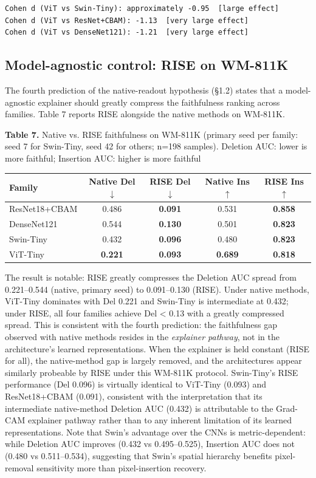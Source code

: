 \documentclass[11pt,a4paper]{article}
\begin{document}
\begin{Verbatim}
Cohen d (ViT vs Swin-Tiny): approximately -0.95  [large effect]
Cohen d (ViT vs ResNet+CBAM): -1.13  [very large effect]
Cohen d (ViT vs DenseNet121): -1.21  [very large effect]
\end{Verbatim}



\subsection{Model-agnostic control: RISE on WM-811K}

The fourth prediction of the native-readout hypothesis (\S{}1.2) states that a model-agnostic explainer should greatly compress the faithfulness ranking across families. Table 7 reports RISE alongside the native methods on WM-811K.

\begin{center}
\small \textbf{Table 7.} Native vs. RISE faithfulness on WM-811K (primary seed per family: seed 7 for Swin-Tiny, seed 42 for others; n=198 samples). Deletion AUC: lower is more faithful; Insertion AUC: higher is more faithful
\end{center}

\begin{tabular}{lcccc}
\toprule
Family & Native Del $\downarrow$ & RISE Del $\downarrow$ & Native Ins $\uparrow$ & RISE Ins $\uparrow$ \\
\midrule
ResNet18+CBAM & 0.486 & \textbf{0.091} & 0.531 & \textbf{0.858} \\
DenseNet121 & 0.544 & \textbf{0.130} & 0.501 & \textbf{0.823} \\
Swin-Tiny & 0.432 & \textbf{0.096} & 0.480 & \textbf{0.823} \\
ViT-Tiny & \textbf{0.221} & \textbf{0.093} & \textbf{0.689} & \textbf{0.818} \\
\bottomrule
\end{tabular}


The result is notable: RISE greatly compresses the Deletion AUC spread from 0.221--0.544 (native, primary seed) to 0.091--0.130 (RISE). Under native methods, ViT-Tiny dominates with Del 0.221 and Swin-Tiny is intermediate at 0.432; under RISE, all four families achieve Del < 0.13 with a greatly compressed spread. This is consistent with the fourth prediction: the faithfulness gap observed with native methods resides in the \emph{explainer pathway}, not in the architecture's learned representations. When the explainer is held constant (RISE for all), the native-method gap is largely removed, and the architectures appear similarly probeable by RISE under this WM-811K protocol. Swin-Tiny's RISE performance (Del 0.096) is virtually identical to ViT-Tiny (0.093) and ResNet18+CBAM (0.091), consistent with the interpretation that its intermediate native-method Deletion AUC (0.432) is attributable to the Grad-CAM explainer pathway rather than to any inherent limitation of its learned representations. Note that Swin's advantage over the CNNs is metric-dependent: while Deletion AUC improves (0.432 vs 0.495--0.525), Insertion AUC does not (0.480 vs 0.511--0.534), suggesting that Swin's spatial hierarchy benefits pixel-removal sensitivity more than pixel-insertion recovery.
\end{document}
